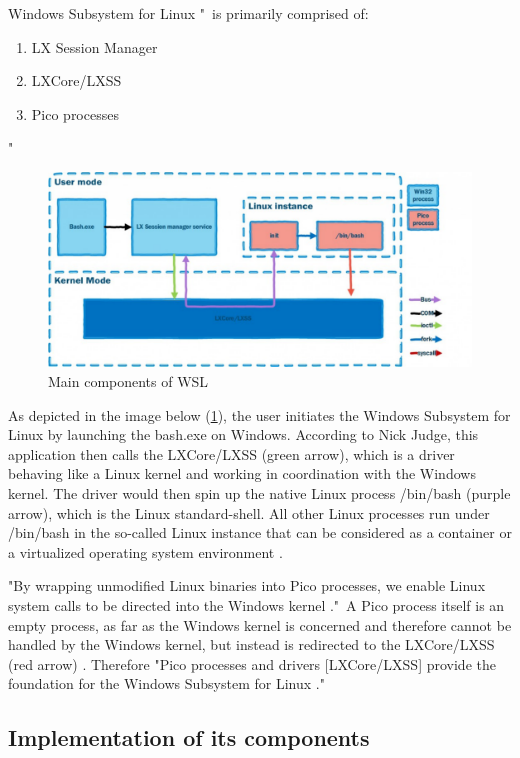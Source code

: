 \documentclass[utf8,biblatex, ngerman, english]{lni}
\begin{document}
Windows Subsystem for Linux "\ is primarily comprised of: 
\begin{enumerate}
    \item LX Session Manager
    \item LXCore/LXSS
    \item Pico processes
\end{enumerate} \cite{Ha16b}"

\begin{figure}
  \centering
  \includegraphics[width=1\textwidth]{WSL Architecture.pdf}
  \caption{Main components of WSL \cite{Ha16b}}
  \label{img:architecture}
\end{figure}

As depicted in the image below (\ref{img:architecture}), the user initiates the Windows Subsystem for Linux by launching the bash.exe on Windows. According to Nick Judge, this application then calls the LXCore/LXSS (green arrow), which is a driver behaving like a Linux kernel and working in coordination with the Windows kernel. The driver would then spin up the native Linux process /bin/bash (purple arrow), which is the Linux standard-shell. All other Linux processes run under /bin/bash in the so-called Linux instance that can be considered as a container or a virtualized operating system environment \cite{Ha16a}.

"By wrapping unmodified Linux binaries into Pico processes, we enable Linux system calls to be directed into the Windows kernel \cite{Ha16b}."\ A Pico process itself is an empty process, as far as the Windows kernel is concerned and therefore cannot be handled by the Windows kernel, but instead is redirected to the LXCore/LXSS (red arrow) \cite{Ha16a}.
Therefore "Pico processes and drivers [LXCore/LXSS] provide the foundation for the Windows Subsystem for Linux \cite{Ha16b}."

\subsection{Implementation of its components}
\end{document}
